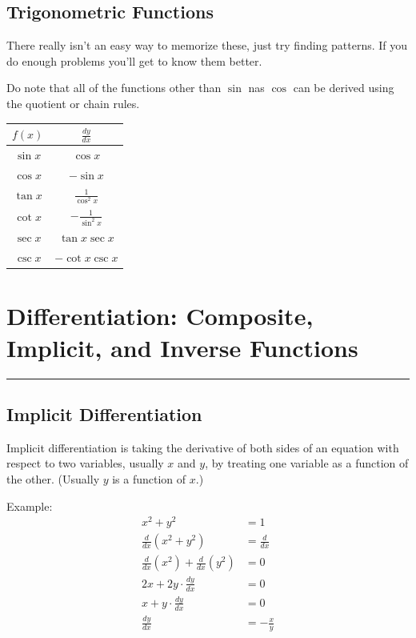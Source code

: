 \documentclass[12pt]{article}
\newcommand{\fline}{\par\noindent\rule{\textwidth}{0.1pt}} %
\begin{document}
\subsection{Trigonometric Functions}
There really isn't an easy way to memorize these, just try finding patterns. If you do enough problems you'll get to know them better.

Do note that all of the functions other than $\sin$ nas $\cos$ can be derived using the quotient or chain rules.
\begin{center}
    \begin{tabular}{|c|c|}
        \hline
        $f(x)$    & $\frac{dy}{dx}$        \\
        \hline \hline
        $\sin{x}$ & $\cos{x}$              \\
        \hline
        $\cos{x}$ & $-\sin{x}$             \\
        \hline
        $\tan{x}$ & $\frac{1}{\cos^2{x}}$  \\
        \hline \hline
        $\cot{x}$ & $-\frac{1}{\sin^2{x}}$ \\
        \hline
        $\sec{x}$ & $\tan{x} \sec{x}$      \\
        \hline
        $\csc{x}$ & $-\cot{x} \csc{x}$     \\
        \hline
    \end{tabular}
\end{center}

\section{Differentiation: Composite, Implicit, and Inverse Functions}
\fline
\subsection{Implicit Differentiation}
Implicit differentiation is taking the derivative of both sides of an equation with respect to two variables, usually $x$ and $y$, by treating one variable as a function of the other. (Usually $y$ is a function of $x$.)

\noindent Example:
\begin{align*}
    x^2 + y^2                                                         & = 1            \\
    \frac{d}{dx} \left( x^2 + y^2 \right)                             & = \frac{d}{dx} \\[6pt]
    \frac{d}{dx} \left( x^2 \right) + \frac{d}{dx} \left( y^2 \right) & = 0            \\[6pt]
    2x + 2y \cdot \frac{dy}{dx}                                       & = 0            \\[6pt]
    x + y \cdot \frac{dy}{dx}                                         & = 0            \\[6pt]
    \frac{dy}{dx}                                                     & = -\frac{x}{y}
\end{align*}
\end{document}
